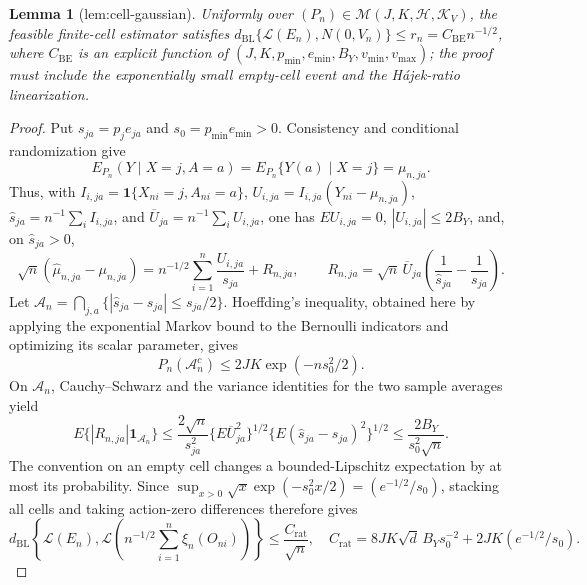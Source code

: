 \documentclass{article}
\newtheorem{lemma}{Lemma}
\begin{document}
\begin{lemma}[lem:cell-gaussian]\label{lem:cell-gaussian}
Uniformly over \((P_n)\in\mathcal M(J,K,\mathcal H,\mathcal K_V)\), the feasible finite-cell estimator satisfies \(d_{\mathrm{BL}}\{\mathcal L(E_n),N(0,V_n)\}\le r_n=C_{\mathrm{BE}}n^{-1/2}\), where \(C_{\mathrm{BE}}\) is an explicit function of \((J,K,p_{\min},e_{\min},B_Y,v_{\min},v_{\max})\); the proof must include the exponentially small empty-cell event and the Hájek-ratio linearization.
\end{lemma}
\begin{proof}
Put \(s_{ja}=p_je_{ja}\) and \(s_0=p_{\min}e_{\min}>0\).  Consistency and conditional randomization give
\[
 E_{P_n}(Y\mid X=j,A=a)=E_{P_n}\{Y(a)\mid X=j\}=\mu_{n,ja}.
\]
Thus, with \(I_{i,ja}=\mathbf 1\{X_{ni}=j,A_{ni}=a\}\), \(U_{i,ja}=I_{i,ja}(Y_{ni}-\mu_{n,ja})\), \(\widehat s_{ja}=n^{-1}\sum_iI_{i,ja}\), and \(\overline U_{ja}=n^{-1}\sum_iU_{i,ja}\), one has \(E U_{i,ja}=0\), \(|U_{i,ja}|\le2B_Y\), and, on \(\widehat s_{ja}>0\),
\[
 \sqrt n(\widehat\mu_{n,ja}-\mu_{n,ja})
 =n^{-1/2}\sum_{i=1}^n\frac{U_{i,ja}}{s_{ja}}
 +R_{n,ja},\qquad
 R_{n,ja}=\sqrt n\,\overline U_{ja}
       \left(\frac1{\widehat s_{ja}}-\frac1{s_{ja}}\right).
\]
Let \(\mathcal A_n=\bigcap_{j,a}\{|\widehat s_{ja}-s_{ja}|\le s_{ja}/2\}\).  Hoeffding's inequality, obtained here by applying the exponential Markov bound to the Bernoulli indicators and optimizing its scalar parameter, gives
\[
 P_n(\mathcal A_n^c)\le2JK\exp(-ns_0^2/2).
\]
On \(\mathcal A_n\), Cauchy--Schwarz and the variance identities for the two sample averages yield
\[
 E\{|R_{n,ja}|\mathbf1_{\mathcal A_n}\}
 \le \frac{2\sqrt n}{s_{ja}^2}
       \{E\overline U_{ja}^2\}^{1/2}
       \{E(\widehat s_{ja}-s_{ja})^2\}^{1/2}
 \le \frac{2B_Y}{s_0^2\sqrt n}.
\]
The convention on an empty cell changes a bounded-Lipschitz expectation by at most its probability.  Since \(\sup_{x>0}\sqrt{x}\exp(-s_0^2x/2)=(e^{-1/2}/s_0)\), stacking all cells and taking action-zero differences therefore gives
\[
 d_{\mathrm{BL}}\!\left\{\mathcal L(E_n),
 \mathcal L\!\left(n^{-1/2}\sum_{i=1}^n\xi_n(O_{ni})\right)\right\}
 \le \frac{C_{\mathrm{rat}}}{\sqrt n},
 \quad
 C_{\mathrm{rat}}=8JK\sqrt d\,B_Ys_0^{-2}+2JK(e^{-1/2}/s_0).
\]


\end{proof}
\end{document}
